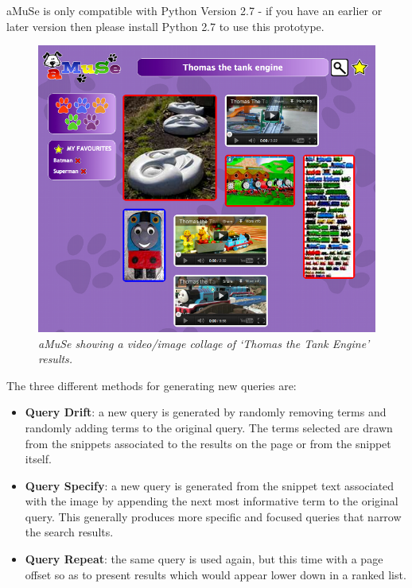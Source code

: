 \documentclass[letterpaper,10pt,english]{sphinxmanual}
\begin{document}
aMuSe is only compatible with Python Version 2.7 - if you have an earlier or later version then please install Python 2.7 to use this prototype.
\begin{figure}[htbp]
\centering
\capstart

\includegraphics{puppy-amuseV3.png}
\caption{\emph{aMuSe showing a video/image collage of `Thomas the Tank Engine' results.}}\end{figure}

The three different methods for generating new queries are:
\begin{itemize}
\item {} 
\textbf{Query Drift}: a new query is generated by randomly removing terms and randomly adding terms to the original query. The terms selected are drawn from the snippets associated to the results on the page or from the snippet itself.

\item {} 
\textbf{Query Specify}: a new query is generated from the snippet text associated with the image by appending the next most informative term to the original query. This generally produces more specific and focused queries that narrow the search results.

\item {} 
\textbf{Query Repeat}: the same query is used again, but this time with a page offset so as to present results which would appear lower down in a ranked list.

\end{itemize}
\end{document}
